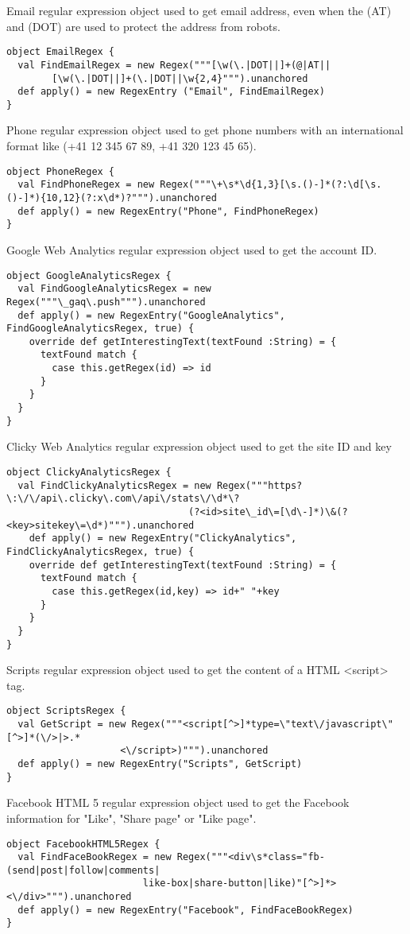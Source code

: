 \documentclass[
	a4paper,					10pt,							twoside,					openright,				notitlepage,			parskip=half,			]{scrreprt}
\begin{document}
Email regular expression object used to get email address, even when the (AT) and (DOT) are used to protect the address from robots.
\begin{lstlisting}
object EmailRegex {
  val FindEmailRegex = new Regex("""[\w(\.|DOT||]+(@|AT||
  		[\w(\.|DOT||]+(\.|DOT||\w{2,4}""").unanchored
  def apply() = new RegexEntry ("Email", FindEmailRegex) 
}
\end{lstlisting}
Phone regular expression object used to get phone numbers with an international format like (+41 12 345 67 89, +41 320 123 45 65).
\begin{lstlisting}
object PhoneRegex {
  val FindPhoneRegex = new Regex("""\+\s*\d{1,3}[\s.()-]*(?:\d[\s.()-]*){10,12}(?:x\d*)?""").unanchored
  def apply() = new RegexEntry("Phone", FindPhoneRegex)
}
\end{lstlisting}
Google Web Analytics regular expression object used to get the account ID.
\begin{lstlisting}
object GoogleAnalyticsRegex {
  val FindGoogleAnalyticsRegex = new Regex("""\_gaq\.push""").unanchored
  def apply() = new RegexEntry("GoogleAnalytics", FindGoogleAnalyticsRegex, true) {
    override def getInterestingText(textFound :String) = {
      textFound match {
      	case this.getRegex(id) => id
      }
    }
  }
}
\end{lstlisting}
Clicky Web Analytics regular expression object used to get the site ID and key
\begin{lstlisting}
object ClickyAnalyticsRegex {
  val FindClickyAnalyticsRegex = new Regex("""https?\:\/\/api\.clicky\.com\/api\/stats\/\d*\?
  								(?<id>site\_id\=[\d\-]*)\&(?<key>sitekey\=\d*)""").unanchored
    def apply() = new RegexEntry("ClickyAnalytics", FindClickyAnalyticsRegex, true) {
    override def getInterestingText(textFound :String) = {
      textFound match {
      	case this.getRegex(id,key) => id+" "+key
      }
    }
  }
}
\end{lstlisting}
Scripts regular expression object used to get the content of a \gls{HTML} <script> tag.
\begin{lstlisting}
object ScriptsRegex {
  val GetScript = new Regex("""<script[^>]*type=\"text\/javascript\"[^>]*(\/>|>.*
  					<\/script>)""").unanchored
  def apply() = new RegexEntry("Scripts", GetScript)
}
\end{lstlisting}
Facebook HTML 5 regular expression object used to get the Facebook information for
"Like", "Share page" or "Like page".
\begin{lstlisting}
object FacebookHTML5Regex {
  val FindFaceBookRegex = new Regex("""<div\s*class="fb-(send|post|follow|comments|
  						like-box|share-button|like)"[^>]*><\/div>""").unanchored
  def apply() = new RegexEntry("Facebook", FindFaceBookRegex)
}
\end{lstlisting}
\end{document}
